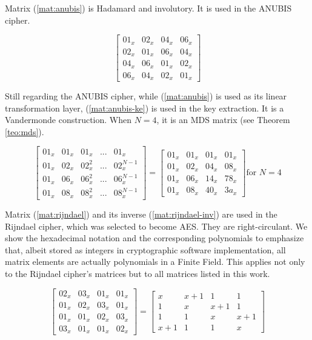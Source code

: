 Matrix (\ref{mat:anubis}) is Hadamard and involutory. It is used in the ANUBIS \cite{ANUBIS2000} cipher.

\begin{equation}\label{mat:anubis}
\begin{bmatrix}
01_x & 02_x & 04_x & 06_x\\
02_x & 01_x & 06_x & 04_x\\
04_x & 06_x & 01_x & 02_x\\
06_x & 04_x & 02_x & 01_x
\end{bmatrix}
\end{equation}

Still regarding the ANUBIS cipher, while (\ref{mat:anubis}) is used as its linear transformation layer, (\ref{mat:anubis-ke}) is used in the key extraction. It is a Vandermonde construction. When $N = 4$, it is an MDS matrix (see Theorem \ref{teo:mds}).

\begin{equation}\label{mat:anubis-ke}
\begin{bmatrix}
01_x & 01_x & 01_x & ... & 01_x\\
01_x & 02_x & 02_x^2 & ... & 02_x^{N-1}\\
01_x & 06_x & 06_x^2 & ... & 06_x^{N-1}\\
01_x & 08_x & 08_x^2 & ... & 08_x^{N-1}
\end{bmatrix}
=
\begin{bmatrix}
01_x & 01_x & 01_x & 01_x\\
01_x & 02_x & 04_x & 08_x\\
01_x & 06_x & 14_x & 78_x\\
01_x & 08_x & 40_x & 3a_x
\end{bmatrix} \text{for } N=4
\end{equation}

Matrix (\ref{mat:rijndael}) and its inverse (\ref{mat:rijndael-inv}) are used in the Rijndael \cite{DesignOfRijndael2002} cipher, which was selected to become AES. They are right-circulant. We show the hexadecimal notation and the corresponding polynomials to emphasize that, albeit stored as integers in cryptographic software implementation, all matrix elements are actually polynomials in a Finite Field. This applies not only to the Rijndael cipher's matrices but to all matrices listed in this work.

\begin{equation}\label{mat:rijndael}
\begin{bmatrix}
02_x & 03_x & 01_x & 01_x\\
01_x & 02_x & 03_x & 01_x\\
01_x & 01_x & 02_x & 03_x\\
03_x & 01_x & 01_x & 02_x
\end{bmatrix}
=
\begin{bmatrix}
x & x+1 & 1 & 1\\
1 & x & x+1 & 1\\
1 & 1 & x & x+1\\
x+1 & 1 & 1 & x
\end{bmatrix}
\end{equation}

